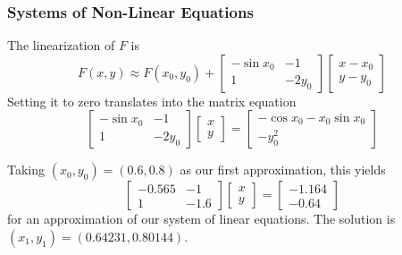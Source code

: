 \documentclass[xcolor=dvipsnames]{beamer}
\begin{document}
\begin{frame}
  \frametitle{Systems of Non-Linear Equations}
  The linearization of $F$ is
  \begin{equation}
    \label{eq:thaitofe}
    F(x,y)\approx{}F(x_{0},y_{0})+\left[
      \begin{array}{cc}
        -\sin{}x_{0} & -1 \\
                 1&-2y_{0}
      \end{array}\right]\left[
      \begin{array}{c}
        x-x_{0} \\
        y-y_{0}
      \end{array}\right]
  \end{equation}
  Setting it to zero translates into the matrix equation
  \begin{equation}
    \label{eq:ooyaiche}
    \left[
    \begin{array}{cc}
      -\sin{}x_{0}&-1 \\
                  1&-2y_{0}
    \end{array}\right]\left[
    \begin{array}{c}
      x \\
      y
    \end{array}\right]=\left[
    \begin{array}{c}
      -\cos{}x_{0}-x_{0}\sin{}x_{0} \\
      -y_{0}^{2}
    \end{array}\right]
  \end{equation}

  Taking $(x_{0},y_{0})=(0.6,0.8)$ as our first approximation, this yields
  \begin{equation}
    \label{eq:foovixah}
    \left[
      \begin{array}{cc}
        -0.565&-1 \\
              1&-1.6
      \end{array}\right]\left[
      \begin{array}{c}
        x \\
        y
      \end{array}\right]=\left[
      \begin{array}{c}
        -1.164 \\
        -0.64
      \end{array}\right]
  \end{equation}
for an approximation of our system of linear equations. The solution
is $(x_{1},y_{1})=(0.64231,0.80144)$. 
\end{frame}
\end{document}
